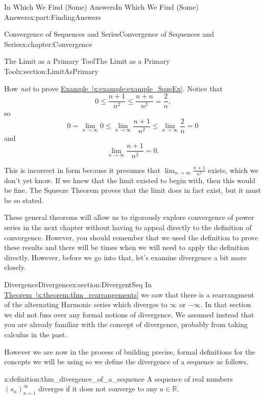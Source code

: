\documentclass[oneside,10pt,]{book}
\newcommand{\xreffont}{\relax}
\numberwithin{equation}{section}
\newcommand{\RR}{\mathbb {R}}
\begin{document}
\begin{partptx}{In Which We Find (Some) Answers}{}{In Which We Find (Some) Answers}{}{}{x:part:FindingAnswers}
\begin{chapterptx}{Convergence of Sequences and Series}{}{Convergence of Sequences and Series}{}{}{x:chapter:Convergence}
\begin{sectionptx}{The Limit as a Primary Tool}{}{The Limit as a Primary Tool}{}{}{x:section:LimitAsPrimary}
\par
How \emph{not} to prove \hyperref[x:example:example_SqzeEx]{Example~{\xreffont\ref{x:example:example_SqzeEx}}}. Notice that%
\begin{equation*}
0\leq\frac{n+1}{n^2}\leq\frac{n+n}{n^2}=\frac{2}{n}\text{,}
\end{equation*}
so%
\begin{equation*}
0=\lim_{n\rightarrow\infty}0 \leq \lim_{n\rightarrow\infty}\frac{n+1}{n^2}\leq\lim_{n\rightarrow\infty}\frac{2}{n}=0
\end{equation*}
and%
\begin{equation*}
\lim_{n\rightarrow\infty}\frac{n+1}{n^2}=0\text{.}
\end{equation*}
%
\par
This is incorrect in form because it presumes that \(\lim_{n\rightarrow\infty}\frac{n+1}{n^2}\) exists, which we don't yet know. If we knew that the limit existed to begin with, then this would be fine. The Squeeze Theorem proves that the limit does in fact exist, but it must be so stated.%
\par
These general theorems will allow us to rigorously explore convergence of power series in the next chapter without having to appeal directly to the definition of convergence. However, you should remember that we used the definition to prove these results and there will be times when we will need to apply the definition directly. However, before we go into that, let's examine divergence a bit more closely.%
\end{sectionptx}
%
%
\typeout{************************************************}
\typeout{************************************************}
%
\begin{sectionptx}{Divergence}{}{Divergence}{}{}{x:section:DivergentSeq}
In \hyperref[x:theorem:thm_rearrangements]{Theorem~{\xreffont\ref{x:theorem:thm_rearrangements}}} we saw that there is a rearrangment of the alternating Harmonic series which diverges to \(\infty\) or \(-\infty\). In that section we did not fuss over any formal notions of divergence. We assumed instead that you are already familiar with the concept of divergence, probably from taking calculus in the past.%
\par
However we are now in the process of building precise, formal definitions for the concepts we will be using so we define the divergence of a sequence as follows.%
\begin{definition}{}{x:definition:thm_divergence_of_a_sequence}%
 A sequence of real numbers \(\left(s_n\right)_{n=1}^\infty\) diverges if it does not converge to any \(a\in\RR\).%

\end{definition}
\end{sectionptx}
\end{chapterptx}
\end{partptx}
\end{document}
